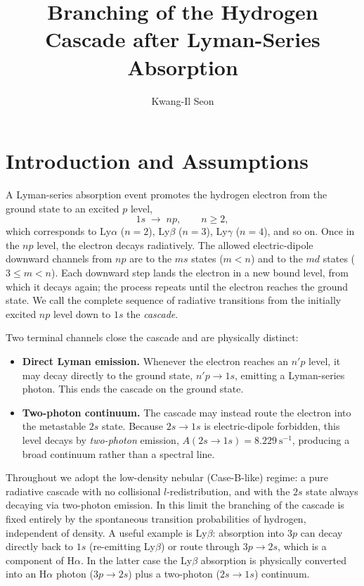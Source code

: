 \documentclass[english,a4paper]{my_memo}
\begin{document}
\title{Branching of the Hydrogen Cascade after Lyman-Series Absorption}
\author{Kwang-Il Seon}
\date{\docmoddate}
\maketitle

\tableofcontents
\bigskip

\section{Introduction and Assumptions}

A Lyman-series absorption event promotes the hydrogen electron from the
ground state to an excited $p$ level,
\begin{equation}
   1s \;\longrightarrow\; np , \qquad n \ge 2 ,
\end{equation}
which corresponds to Ly$\alpha$ ($n=2$), Ly$\beta$ ($n=3$), Ly$\gamma$
($n=4$), and so on.  Once in the $np$ level, the electron decays
radiatively.  The allowed electric-dipole downward channels from $np$ are
to the $ms$ states ($m<n$) and to the $md$ states ($3 \le m < n$).  Each
downward step lands the electron in a new bound level, from which it decays
again; the process repeats until the electron reaches the ground state.  We
call the complete sequence of radiative transitions from the initially
excited $np$ level down to $1s$ the \emph{cascade}.

Two terminal channels close the cascade and are physically distinct:
\begin{itemize}
   \item[(a)] \textbf{Direct Lyman emission.}  Whenever the electron reaches
     an $n'p$ level, it may decay directly to the ground state,
     $n'p \to 1s$, emitting a Lyman-series photon.  This ends the cascade on
     the ground state.
   \item[(b)] \textbf{Two-photon continuum.}  The cascade may instead route
     the electron into the metastable $2s$ state.  Because $2s \to 1s$ is
     electric-dipole forbidden, this level decays by \emph{two-photon}
     emission, $A(2s \to 1s) = 8.229~\mathrm{s}^{-1}$, producing a broad
     continuum rather than a spectral line.
\end{itemize}

Throughout we adopt the low-density nebular (Case-B-like) regime: a pure
radiative cascade with no collisional $l$-redistribution, and with the $2s$
state always decaying via two-photon emission.  In this limit the branching
of the cascade is fixed entirely by the spontaneous transition
probabilities of hydrogen, independent of density.  A useful example is
Ly$\beta$: absorption into $3p$ can decay directly back to $1s$
(re-emitting Ly$\beta$) or route through $3p \to 2s$, which is a component
of H$\alpha$.  In the latter case the Ly$\beta$ absorption is physically
converted into an H$\alpha$ photon ($3p \to 2s$) plus a two-photon
($2s \to 1s$) continuum.
\end{document}
